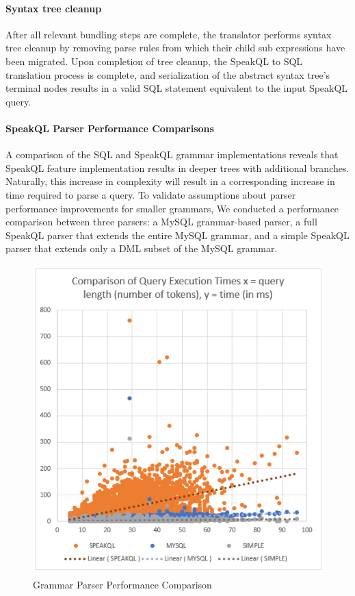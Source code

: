 
\paragraph{Syntax tree cleanup}

After all relevant bundling steps are complete, the translator performs syntax tree cleanup by removing parse rules from which their child sub expressions have been migrated. Upon completion of tree cleanup, the SpeakQL to SQL translation process is complete, and serialization of the abstract syntax tree's terminal nodes results in a valid SQL statement equivalent to the input SpeakQL query.


\paragraph{\textbf{SpeakQL Parser Performance Comparisons}}
A comparison of the SQL and SpeakQL grammar implementations reveals that SpeakQL feature implementation results in deeper trees with additional branches. Naturally, this increase in complexity will result in a corresponding increase in time required to parse a query. To validate assumptions about parser performance improvements for smaller grammars, We conducted a performance comparison between three parsers: a MySQL grammar-based parser, a full SpeakQL parser that extends the entire MySQL grammar, and a simple SpeakQL parser that extends only a DML subset of the MySQL grammar. 

\begin{figure}
    \centering
    \includegraphics[width=0.5\linewidth]{figures/parser-performance-plot.png}
    \caption{Grammar Parser Performance Comparison}
    \label{fig:parserperformanceplot}
\end{figure}

